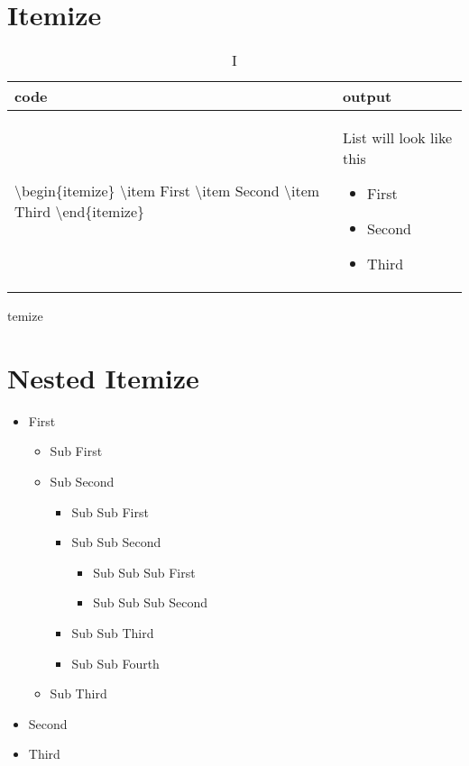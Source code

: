 \documentclass[a4paper, 10pt]{book}
\begin{document}
\section{Itemize}
\begin{table}[!h]
    \begin{tabularx}{15cm}{|X|X|}
        \hline
        \textbf{code} & \textbf{output} \\
        \hline
        \textbackslash begin\{itemize\}   \newline
        \textbackslash item First   \newline        %
        \textbackslash item Second  \newline
        \textbackslash item Third   \newline
        \textbackslash end\{itemize\} \newline
             &
        List will look like this
        \begin{itemize}
            \item First
            \item Second
            \item Third
        \end{itemize}
        \\
        \hline
    \end{tabularx}
		\caption Itemize
\end{table}

\section{Nested Itemize}
\begin{itemize}
	\item First
	\begin{itemize}
		\item Sub First
		\item Sub Second
		\begin{itemize}
			\item Sub Sub First
			\item Sub Sub Second
			\begin{itemize}
				\item Sub Sub Sub First
				\item Sub Sub Sub Second
			\end{itemize}
			\item Sub Sub Third
			\item Sub Sub Fourth
		\end{itemize}
		\item Sub Third
	\end{itemize}
	\item Second
	\item Third
\end{itemize}
\end{document}
